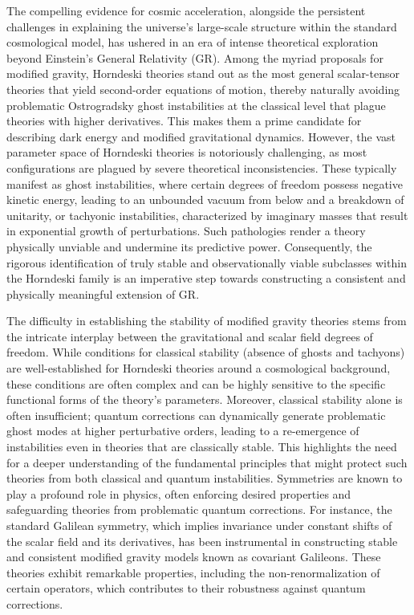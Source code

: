 \documentclass[twocolumn]{aastex631}
\begin{document}
The compelling evidence for cosmic acceleration, alongside the persistent challenges in explaining the universe's large-scale structure within the standard cosmological model, has ushered in an era of intense theoretical exploration beyond Einstein's General Relativity (GR). Among the myriad proposals for modified gravity, Horndeski theories stand out as the most general scalar-tensor theories that yield second-order equations of motion, thereby naturally avoiding problematic Ostrogradsky ghost instabilities at the classical level that plague theories with higher derivatives. This makes them a prime candidate for describing dark energy and modified gravitational dynamics. However, the vast parameter space of Horndeski theories is notoriously challenging, as most configurations are plagued by severe theoretical inconsistencies. These typically manifest as ghost instabilities, where certain degrees of freedom possess negative kinetic energy, leading to an unbounded vacuum from below and a breakdown of unitarity, or tachyonic instabilities, characterized by imaginary masses that result in exponential growth of perturbations. Such pathologies render a theory physically unviable and undermine its predictive power. Consequently, the rigorous identification of truly stable and observationally viable subclasses within the Horndeski family is an imperative step towards constructing a consistent and physically meaningful extension of GR.

The difficulty in establishing the stability of modified gravity theories stems from the intricate interplay between the gravitational and scalar field degrees of freedom. While conditions for classical stability (absence of ghosts and tachyons) are well-established for Horndeski theories around a cosmological background, these conditions are often complex and can be highly sensitive to the specific functional forms of the theory's parameters. Moreover, classical stability alone is often insufficient; quantum corrections can dynamically generate problematic ghost modes at higher perturbative orders, leading to a re-emergence of instabilities even in theories that are classically stable. This highlights the need for a deeper understanding of the fundamental principles that might protect such theories from both classical and quantum instabilities. Symmetries are known to play a profound role in physics, often enforcing desired properties and safeguarding theories from problematic quantum corrections. For instance, the standard Galilean symmetry, which implies invariance under constant shifts of the scalar field and its derivatives, has been instrumental in constructing stable and consistent modified gravity models known as covariant Galileons. These theories exhibit remarkable properties, including the non-renormalization of certain operators, which contributes to their robustness against quantum corrections.
\end{document}
